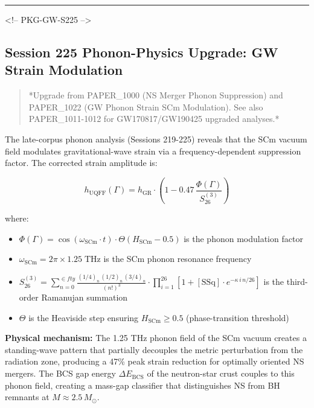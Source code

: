 \documentclass[12pt,a4paper]{article}
\begin{document}
\medskip\hrule\medskip

<!-- PKG-GW-S225 -->

\subsection{Session 225 Phonon-Physics Upgrade: GW Strain Modulation}

\begin{quote}
*Upgrade from PAPER\_1000 (NS Merger Phonon Suppression) and PAPER\_1022
(GW Phonon Strain SCm Modulation). See also PAPER\_1011-1012 for
GW170817/GW190425 upgraded analyses.*
\end{quote}

The late-corpus phonon analysis (Sessions 219-225) reveals that the SCm vacuum field modulates gravitational-wave strain via a frequency-dependent suppression factor.  The corrected strain amplitude is:

\begin{equation}
h_{\text{UQFF}}(\Gamma) = h_{\text{GR}} \cdot \left(1 - 0.47\,\frac{\Phi(\Gamma)}{S_{26}^{(3)}}\right)
\end{equation}

where:

\begin{itemize}
  \item $\Phi(\Gamma) = \cos(\omega_{\text{SCm}} \cdot t) \cdot \Theta(H_{\text{SCm}} - 0.5)$ is the phonon modulation factor
  \item $\omega_{\text{SCm}} = 2\pi \times 1.25\;\text{THz}$ is the SCm phonon resonance frequency
  \item $S_{26}^{(3)} = \sum_{n=0}^{\in fty} \frac{(1/4)_n\,(1/2)_n\,(3/4)_n}{(n!)^3} \cdot \prod_{i=1}^{26}\left[1 + [\text{SSq}]\cdot e^{-\kappa\,i\,n/26}\right]$ is the third-order Ramanujan summation
  \item $\Theta$ is the Heaviside step ensuring $H_{\text{SCm}} \geq 0.5$ (phase-transition threshold)
\end{itemize}

\textbf{Physical mechanism:} The 1.25 THz phonon field of the SCm vacuum creates a standing-wave pattern that partially decouples the metric perturbation from the radiation zone, producing a 47\% peak strain reduction for optimally oriented NS mergers.  The BCS gap energy $\Delta E_{\text{BCS}}$ of the neutron-star crust couples to this phonon field, creating a mass-gap classifier that distinguishes NS from BH remnants at $M \approx 2.5\,M_\odot$.
\end{document}
